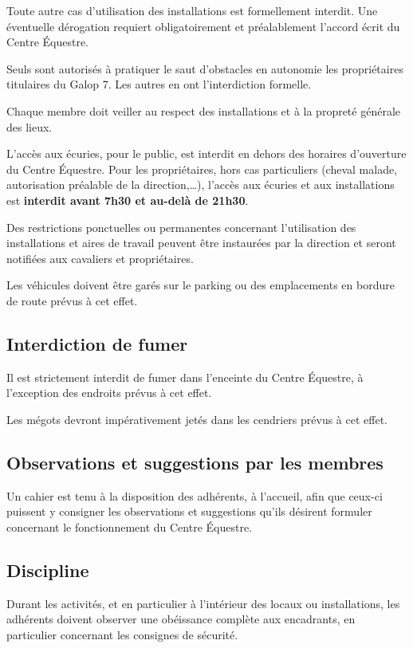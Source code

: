 \documentclass[11pt,a4paper]{article}
\begin{document}
Toute autre cas d'utilisation des installations est formellement interdit. Une éventuelle dérogation requiert obligatoirement et préalablement l'accord écrit du Centre Équestre.

Seuls sont autorisés à pratiquer le saut d'obstacles en autonomie les propriétaires titulaires du Galop 7. Les autres en ont l'interdiction formelle.

Chaque membre doit veiller au respect des installations et à la propreté générale des lieux.

L'accès aux écuries, pour le public, est interdit en dehors des horaires d'ouverture du Centre Équestre. Pour les propriétaires, hors cas particuliers (cheval malade, autorisation préalable de la direction,\dots), l'accès aux écuries et aux installations est \textbf{interdit avant 7h30 et au-delà de 21h30}.

Des restrictions ponctuelles ou permanentes concernant l'utilisation des installations et aires de travail peuvent être instaurées par la direction et seront notifiées aux cavaliers et propriétaires.

Les véhicules doivent être garés sur le parking ou des emplacements en bordure de route prévus à cet effet.

\subsection{Interdiction de fumer}
Il est strictement interdit de fumer dans l'enceinte du Centre Équestre, à l'exception des endroits prévus à cet effet.

Les mégots devront impérativement jetés dans les cendriers prévus à cet effet.

\subsection{Observations et suggestions par les membres}
Un cahier est tenu à la disposition des adhérents, à l'accueil, afin que ceux-ci puissent y consigner les observations et suggestions qu'ils désirent formuler concernant le fonctionnement du Centre Équestre.

\subsection{Discipline}
Durant les activités, et en particulier à l'intérieur des locaux ou installations, les adhérents doivent observer une obéissance complète aux encadrants, en particulier concernant les consignes de sécurité.
\end{document}
